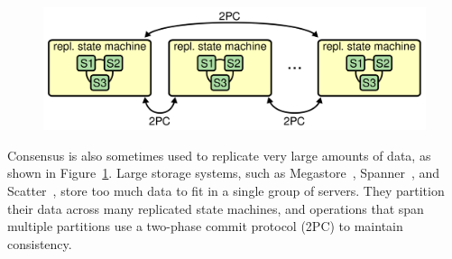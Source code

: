 \begin{figure}
\centering
\includegraphics[scale=.5]{motivation/bigdata}
\label{fig:motivation:bigdata}
\end{figure}

Consensus is also sometimes used to replicate very large amounts of
data, as shown in Figure~\ref{fig:motivation:bigdata}. Large storage
systems, such as Megastore~\cite{Baker:2011},
Spanner~\cite{Corbett:2012}, and Scatter~\cite{Glendenning:2011},
store too much data to fit in a single group
of servers. They partition their data across many replicated state machines,
and operations that span multiple partitions use a two-phase commit
protocol (2PC) to
maintain consistency.


